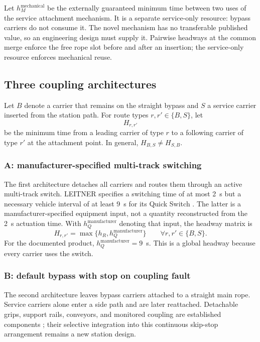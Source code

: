 \documentclass[11pt,a4paper]{scrartcl}
\begin{document}
Let $h_M^{\mathrm{mechanical}}$ be the externally guaranteed minimum time
between two uses of the service attachment mechanism.  It is a separate
service-only resource: bypass carriers do not consume it.  The novel mechanism
has no transferable published value, so an engineering design must supply it.
Pairwise headways at the common merge enforce the free rope slot before and
after an insertion; the service-only resource enforces mechanical reuse.

\subsection{Three coupling architectures}

Let $B$ denote a carrier that remains on the straight bypass and $S$ a service
carrier inserted from the station path.  For route types
$r,r'\in\{B,S\}$, let
\[
H_{r,r'}
\]
be the minimum time from a leading carrier of type $r$ to a following carrier
of type $r'$ at the attachment point.  In general,
$H_{B,S}\ne H_{S,B}$.

\subsubsection{A: manufacturer-specified multi-track switching}

The first architecture detaches all carriers and routes them through an active
multi-track switch.  LEITNER specifies a switching time of at most 2~s but a
necessary vehicle interval of at least 9~s for its Quick Switch
\cite{leitnerQuickSwitch}.  The latter is a manufacturer-specified equipment
input, not a quantity reconstructed from the 2~s actuation time.  With
$h_Q^{\mathrm{manufacturer}}$ denoting that input, the headway matrix is
\begin{equation}
H_{r,r'}=\max\{h_R,h_Q^{\mathrm{manufacturer}}\}
\qquad\forall r,r'\in\{B,S\}.
\label{eq:architecture-a}
\end{equation}
For the documented product, $h_Q^{\mathrm{manufacturer}}=9$~s.  This is a global
headway because every carrier uses the switch.

\subsubsection{B: default bypass with stop on coupling fault}

The second architecture leaves bypass carriers attached to a straight main
rope.  Service carriers alone enter a side path and are later reattached.
Detachable grips, support rails, conveyors, and monitored coupling are
established components \cite{leitnerGripCoupling,conventionalDetachablePatent};
their selective integration into this continuous skip-stop arrangement remains
a new station design.
\end{document}
